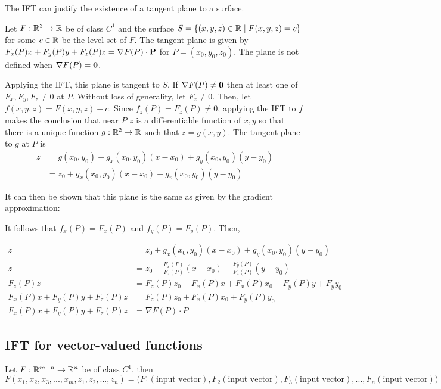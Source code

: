 The IFT can justify the existence of a tangent plane to a surface.

Let $F:\mathbb{R}^3\to \mathbb{R}$ be of class $C^1$ and the surface $S=\{(x,y,z)\in\mathbb{R}\;|\;F(x,y,z)=c\}$ for some $c\in\mathbb{R}$ be the level set of $F$.
The tangent plane is given by $F_x(P)x+F_y(P)y+F_z(P)z=\nabla F(P)\cdot \textbf P$ for $P=(x_0,y_0,z_0)$. The plane is not defined when
$\nabla F(P)=\textbf 0$. 

Applying the IFT, this plane is tangent to $S$. If $\nabla F(P)\neq \textbf 0$ then at least one of $F_x,F_y,F_z\neq 0$ at $P$.
Without loss of generality, let $F_z\neq 0$. Then, let $f(x,y,z)=F(x,y,z)-c$. Since $f_z(P)=F_z(P)\neq 0$, applying the IFT to $f$ makes the conclusion that 
near $P$ $z$ is a differentiable function of $x,y$ so that there is a unique function $g:\mathbb{R}^2\to \mathbb{R}$ such that $z=g(x,y)$. The tangent plane to $g$ at $P$ is 
\begin{align*}
    z &=g\left(x_{0}, y_{0}\right)+g_{x}\left(x_{0}, y_{0}\right)\left(x-x_{0}\right)+g_{y}\left(x_{0}, y_{0}\right)\left(y-y_{0}\right) \\
    &=z_{0}+g_{x}\left(x_{0}, y_{0}\right)\left(x-x_{0}\right)+g_{v}\left(x_{0}, y_{0}\right)\left(y-y_{0}\right)
\end{align*}

It can then be shown that this plane is the same as given by the gradient approximation:

It follows that $f_x(P)=F_x(P)$ and $f_y(P)=F_y(P)$. Then,

\begin{align*}
    z&=z_0+g_x(x_0,y_0)(x-x_0)+g_y(x_0,y_0)(y-y_0)\\
    z&=z_0-\frac{F_x(P)}{F_z(P)}(x-x_0)-\frac{F_y(P)}{F_z(P)}(y-y_0)\\
    F_z(P)z&=F_z(P)z_0-F_x(P)x+F_x(P)x_0-F_y(P)y+F_yy_0\\
    F_x(P)x+F_y(P)y+F_z(P)z&=F_z(P)z_0+F_x(P)x_0+F_y(P)y_0\\
    F_x(P)x+F_y(P)y+F_z(P)z&=\nabla F(P)\cdot P
\end{align*}

\subsection{IFT for vector-valued functions}

Let $F:\mathbb{R}^{m+n}\to \mathbb{R}^n$ be of class $C^1$, then 
\[F(x_1, x_2, x_3,...,x_m, z_1, z_2, ..., z_n)=\Big(F_1(\mbox{input vector}), F_2(\mbox{input vector}), F_3(\mbox{input vector}),...,F_n(\mbox{input vector})\Big)\]

